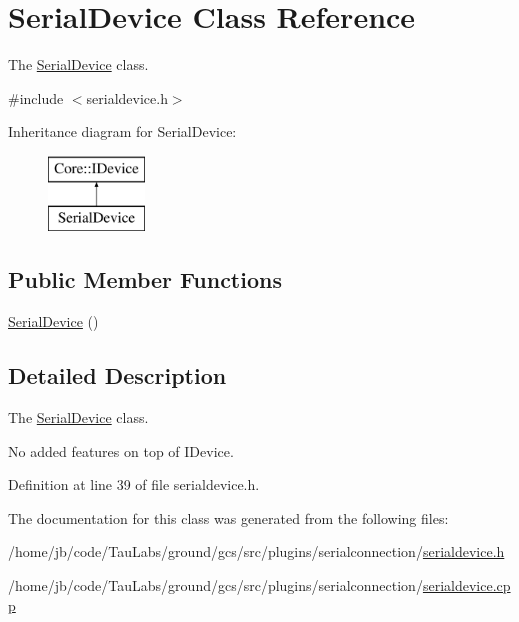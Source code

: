 \hypertarget{class_serial_device}{\section{\-Serial\-Device \-Class \-Reference}
\label{class_serial_device}
}


\-The \hyperlink{class_serial_device}{\-Serial\-Device} class.  




{\ttfamily \#include $<$serialdevice.\-h$>$}

\-Inheritance diagram for \-Serial\-Device\-:\begin{figure}[H]
\begin{center}
\leavevmode
\includegraphics[height=2.000000cm]{class_serial_device}
\end{center}
\end{figure}
\subsection*{\-Public \-Member \-Functions}
\begin{DoxyCompactItemize}
\item 
\hyperlink{group___core_plugin_gaad126bede3b0adf49e1fbe3afd7c6c42}{\-Serial\-Device} ()
\end{DoxyCompactItemize}


\subsection{\-Detailed \-Description}
\-The \hyperlink{class_serial_device}{\-Serial\-Device} class. 

\-No added features on top of \-I\-Device. 

\-Definition at line 39 of file serialdevice.\-h.



\-The documentation for this class was generated from the following files\-:\begin{DoxyCompactItemize}
\item 
/home/jb/code/\-Tau\-Labs/ground/gcs/src/plugins/serialconnection/\hyperlink{serialdevice_8h}{serialdevice.\-h}\item 
/home/jb/code/\-Tau\-Labs/ground/gcs/src/plugins/serialconnection/\hyperlink{serialdevice_8cpp}{serialdevice.\-cpp}\end{DoxyCompactItemize}
